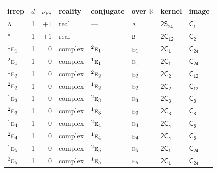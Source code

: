 \documentclass[10pt,a4paper]{article}
\numberwithin{equation}{section}
\newcommand{\grp}[1]{\mathsf{#1}}
\newcommand{\irr}[1]{\text{\normalfont\scshape #1}}
\newcommand{\conjpair}[1]{{}^{#1}}
\newcommand{\detbox}[1]{{\setlength{\fboxsep}{1pt}\fbox{#1}}}
\newcommand{\fsind}{\nu_{\mathrm{FS}}}
\begin{document}
{\small\renewcommand{\arraystretch}{1.25}\setlength{\tabcolsep}{4pt}\begin{longtable}{@{}lrrlllll@{}}\toprule
irrep & $d$ & $\fsind$ & reality & conjugate & over $\mathbb{R}$ & kernel & image\\\midrule\endhead
\bottomrule\endfoot\endlastfoot
$\irr{a}$ & 1 & $+1$ & real & --- & $\irr{a}$ & \href{2S24.pdf}{$\grp{2S_{24}}$} & \href{../../../rotation/data/pdf/C1.pdf}{$\grp{C_{1}}$}\\*
\detbox{$\irr{b}$} & 1 & $+1$ & real & --- & $\irr{b}$ & \href{2C12.pdf}{$\grp{2C_{12}}$} & \href{../../../rotation/data/pdf/C2.pdf}{$\grp{C_{2}}$}\\
$\conjpair{1}\irr{e}_{1}$ & 1 & $0$ & complex & $\conjpair{2}\irr{e}_{1}$ & $\irr{e}_{1}$ & \href{2C1.pdf}{$\grp{2C_{1}}$} & $\grp{C_{24}}$\\
$\conjpair{2}\irr{e}_{1}$ & 1 & $0$ & complex & $\conjpair{1}\irr{e}_{1}$ & $\irr{e}_{1}$ & \href{2C1.pdf}{$\grp{2C_{1}}$} & $\grp{C_{24}}$\\
$\conjpair{1}\irr{e}_{2}$ & 1 & $0$ & complex & $\conjpair{2}\irr{e}_{2}$ & $\irr{e}_{2}$ & \href{2C2.pdf}{$\grp{2C_{2}}$} & \href{../../../rotation/data/pdf/C12.pdf}{$\grp{C_{12}}$}\\
$\conjpair{2}\irr{e}_{2}$ & 1 & $0$ & complex & $\conjpair{1}\irr{e}_{2}$ & $\irr{e}_{2}$ & \href{2C2.pdf}{$\grp{2C_{2}}$} & \href{../../../rotation/data/pdf/C12.pdf}{$\grp{C_{12}}$}\\
$\conjpair{1}\irr{e}_{3}$ & 1 & $0$ & complex & $\conjpair{2}\irr{e}_{3}$ & $\irr{e}_{3}$ & \href{2C3.pdf}{$\grp{2C_{3}}$} & \href{../../../rotation/data/pdf/C8.pdf}{$\grp{C_{8}}$}\\
$\conjpair{2}\irr{e}_{3}$ & 1 & $0$ & complex & $\conjpair{1}\irr{e}_{3}$ & $\irr{e}_{3}$ & \href{2C3.pdf}{$\grp{2C_{3}}$} & \href{../../../rotation/data/pdf/C8.pdf}{$\grp{C_{8}}$}\\
$\conjpair{1}\irr{e}_{4}$ & 1 & $0$ & complex & $\conjpair{2}\irr{e}_{4}$ & $\irr{e}_{4}$ & \href{2C4.pdf}{$\grp{2C_{4}}$} & \href{../../../rotation/data/pdf/C6.pdf}{$\grp{C_{6}}$}\\
$\conjpair{2}\irr{e}_{4}$ & 1 & $0$ & complex & $\conjpair{1}\irr{e}_{4}$ & $\irr{e}_{4}$ & \href{2C4.pdf}{$\grp{2C_{4}}$} & \href{../../../rotation/data/pdf/C6.pdf}{$\grp{C_{6}}$}\\
$\conjpair{1}\irr{e}_{5}$ & 1 & $0$ & complex & $\conjpair{2}\irr{e}_{5}$ & $\irr{e}_{5}$ & \href{2C1.pdf}{$\grp{2C_{1}}$} & $\grp{C_{24}}$\\
$\conjpair{2}\irr{e}_{5}$ & 1 & $0$ & complex & $\conjpair{1}\irr{e}_{5}$ & $\irr{e}_{5}$ & \href{2C1.pdf}{$\grp{2C_{1}}$} & $\grp{C_{24}}$\\

\end{longtable}}
\end{document}
